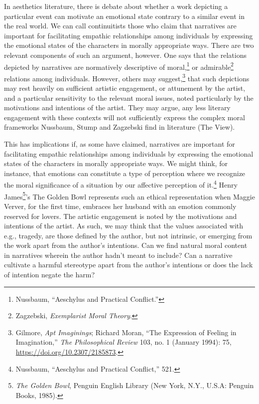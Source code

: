 \documentclass[phdthesis,12pt,final,a4paper]{wuthesis}
\theoremstyle{definition}
\theoremstyle{definition}
\theoremstyle{definition}
\theoremstyle{definition}
\theoremstyle{remark}
\begin{document}
In aesthetics literature, there is debate about whether a work depicting a particular event can motivate an emotional state contrary to a similar event in the real world. We can call continuitists those who claim that narratives are important for facilitating empathic relationships among individuals by expressing the emotional states of the characters in morally appropriate ways. There are two relevant components of such an argument, however. One says that the relations depicted by narratives are normatively descriptive of moral,\footnote{Nussbaum, {``Aeschylus and Practical Conflict.''}} or admirable\footnote{Zagzebski, \emph{Exemplarist {Moral Theory}}.} relations among individuals. However, others may suggest,\footnote{Gilmore, \emph{Apt {Imaginings}}; Richard Moran, {``The {Expression} of {Feeling} in {Imagination},''} \emph{The Philosophical Review} 103, no. 1 (January 1994): 75, \url{https://doi.org/10.2307/2185873}.} that such depictions may rest heavily on sufficient artistic engagement, or attunement by the artist, and a particular sensitivity to the relevant moral issues, noted particularly by the motivations and intentions of the artist. They may argue, any less literary engagement with these contexts will not sufficiently express the complex moral frameworks Nussbaum, Stump and Zagzebski find in literature (The View).

This has implications if, as some have claimed, narratives are important for facilitating empathic relationships among individuals by expressing the emotional states of the characters in morally appropriate ways. We might think, for instance, that emotions can constitute a type of perception where we recognize the moral significance of a situation by our affective perception of it.\footnote{Nussbaum, {``Aeschylus and Practical Conflict,''} 521.} Henry James\footnote{\emph{The Golden Bowl}, Penguin {English} Library (New York, N.Y., U.S.A: Penguin Books, 1985).}'s The Golden Bowl represents such an ethical representation when Maggie Verver, for the first time, embraces her husband with an emotion commonly reserved for lovers. The artistic engagement is noted by the motivations and intentions of the artist. As such, we may think that the values associated with e.g., tragedy, are those defined by the author, but not intrinsic, or emerging from the work apart from the author's intentions. Can we find natural moral content in narratives wherein the author hadn't meant to include? Can a narrative cultivate a harmful stereotype apart from the author's intentions or does the lack of intention negate the harm?
\end{document}

